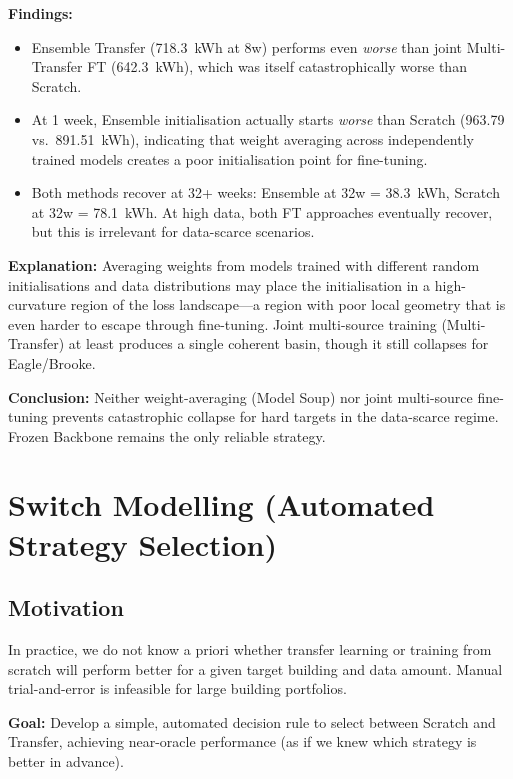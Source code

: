\documentclass[12pt,a4paper]{report}
\begin{document}
\textbf{Findings:}

\begin{itemize}
    \item Ensemble Transfer (718.3~kWh at 8w) performs even \textit{worse} than joint Multi-Transfer FT (642.3~kWh), which was itself catastrophically worse than Scratch.
    \item At 1 week, Ensemble initialisation actually starts \textit{worse} than Scratch (963.79 vs.\ 891.51~kWh), indicating that weight averaging across independently trained models creates a poor initialisation point for fine-tuning.
    \item Both methods recover at 32+ weeks: Ensemble at 32w = 38.3~kWh, Scratch at 32w = 78.1~kWh. At high data, both FT approaches eventually recover, but this is irrelevant for data-scarce scenarios.
\end{itemize}

\textbf{Explanation:} Averaging weights from models trained with different random initialisations and data distributions may place the initialisation in a high-curvature region of the loss landscape---a region with poor local geometry that is even harder to escape through fine-tuning. Joint multi-source training (Multi-Transfer) at least produces a single coherent basin, though it still collapses for Eagle/Brooke.

\textbf{Conclusion:} Neither weight-averaging (Model Soup) nor joint multi-source fine-tuning prevents catastrophic collapse for hard targets in the data-scarce regime. Frozen Backbone remains the only reliable strategy.

\section{Switch Modelling (Automated Strategy Selection)}

\subsection{Motivation}

In practice, we do not know a priori whether transfer learning or training from scratch will perform better for a given target building and data amount. Manual trial-and-error is infeasible for large building portfolios.

\textbf{Goal:} Develop a simple, automated decision rule to select between Scratch and Transfer, achieving near-oracle performance (as if we knew which strategy is better in advance).
\end{document}
